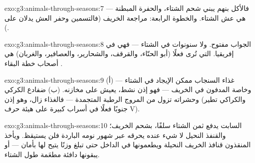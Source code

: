 \begin{solution}{exo:g3:animals-through-seasons:7}
 --- فالأكل بنهم يبني شحم الشتاء، والحفرة المبطنة 
هي عش الشتاء. والخطوة الرابعة: مراجعة الخريف (فالتسمين وحفر العش
يدلان على ).
\end{solution}

\begin{solution}{exo:g3:animals-through-seasons:8}
الجواب مفتوح. ولا سنونوات في الشتاء --- فهي في إفريقيا. 
التي تُرى فعلًا (أبو الحنّاء، والقرقف، والشحارير، والعصافير،
والغربان) هي أصحاب خطة البقاء .
\end{solution}

\begin{solution}{exo:g3:animals-through-seasons:9}
(أ) غذاء السنجاب ممكن الإيجاد في الشتاء --- وخاصة المدفون في
الخريف --- فهو إذن نشط، يعيش على مخازنه. (ب) ضفادع الكركي وحشراته
تزول من المروج الرطبة المتجمدة --- فالغذاء زال، وهو إذن 
(والكراكي تطير جنوبًا فعلًا في أسراب كبيرة على هيئة حرف V).
\end{solution}

\begin{solution}{exo:g3:animals-through-seasons:10}
السابت يدفع ثمن الشتاء سلفًا، بشحم الخريف؛ والقنفذ النحيل لا شيء
عنده يحرقه عبر شهور نومه الباردة فلن يستيقظ. ويأخذ المنقذون قنافذ
الخريف النحيلة ويطعمونها في الداخل حتى تبلغ وزنًا يتيح لها 
بأمان --- أو يبقونها دافئة مطعَمة طول الشتاء.
\end{solution}

